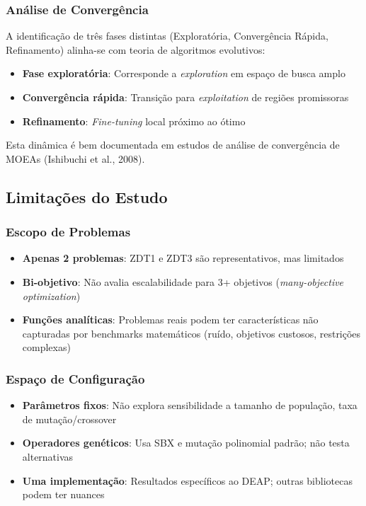 \subsubsection{Análise de Convergência}

A identificação de três fases distintas (Exploratória, Convergência Rápida, Refinamento) alinha-se com teoria de algoritmos evolutivos:

\begin{itemize}
    \item \textbf{Fase exploratória}: Corresponde a \textit{exploration} em espaço de busca amplo
    
    \item \textbf{Convergência rápida}: Transição para \textit{exploitation} de regiões promissoras
    
    \item \textbf{Refinamento}: \textit{Fine-tuning} local próximo ao ótimo
\end{itemize}

Esta dinâmica é bem documentada em estudos de análise de convergência de MOEAs (Ishibuchi et al., 2008).

\subsection{Limitações do Estudo}

\subsubsection{Escopo de Problemas}

\begin{itemize}
    \item \textbf{Apenas 2 problemas}: ZDT1 e ZDT3 são representativos, mas limitados
    \item \textbf{Bi-objetivo}: Não avalia escalabilidade para 3+ objetivos (\textit{many-objective optimization})
    \item \textbf{Funções analíticas}: Problemas reais podem ter características não capturadas por benchmarks matemáticos (ruído, objetivos custosos, restrições complexas)
\end{itemize}

\subsubsection{Espaço de Configuração}

\begin{itemize}
    \item \textbf{Parâmetros fixos}: Não explora sensibilidade a tamanho de população, taxa de mutação/crossover
    \item \textbf{Operadores genéticos}: Usa SBX e mutação polinomial padrão; não testa alternativas
    \item \textbf{Uma implementação}: Resultados específicos ao DEAP; outras bibliotecas podem ter nuances
\end{itemize}

